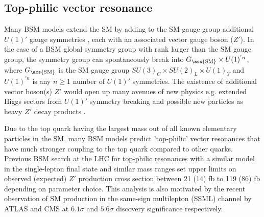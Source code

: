 \documentclass[../thesis.tex]{subfiles}
\begin{document}
\subsection{Top-philic vector resonance}
\label{sec:ttZp}
Many \acs{BSM} models extend the \acs{SM} by adding to the \acs{SM} gauge group additional $U(1)'$ gauge symmetries \citep{theory:Zp_U1p,theory:Zp_U1p_ee}, each with an associated vector gauge boson ($Z'$). In the case of a \acs{BSM} global symmetry group with rank larger than the \acs{SM} gauge group, the symmetry group can spontaneously break into $G_\text{\acs{SM}}\times U(1)^{'n}$, where $G_\text{\acs{SM}}$ is the \acs{SM} gauge group $SU(3)_C \times SU(2)_L \times U(1)_Y$ and $U(1)^{'n}$ is any $n\geq 1$ number of $U(1)'$ symmetries. The existence of additional vector boson(s) $Z'$ would open up many avenues of new physics e.g. extended Higgs sectors from $U(1)'$ symmetry breaking \citep{theory:little_higgs,theory:little_higgs2}
and possible new particles as heavy $Z'$ decay products \citep{theory:Zp}.

Due to the top quark having the largest mass out of all known elementary particles in the \acs{SM}, many \acs{BSM} models \citep{Darm__2021,Craig:2015jba,Craig_2017,Branco:2011iw,PhysRevD.93.075038,higgscomp,theory:ttZp_LHC,theory:Zp_topphilic} predict 'top-philic' vector resonances that have much stronger coupling to the top quark compared to other quarks.
Previous \acs{BSM} \tttt search at the \acs{LHC} for top-philic resonances \citep{theory:ttZp_1los} with a similar model in the single-lepton final state and similar mass ranges set upper limits on observed (expected) $Z'$ production cross section between 21 (14) fb to 119 (86) fb depending on parameter choice. This analysis is also motivated by the recent observation of \acs{SM} \tttt production in the same-sign multilepton (\acs{SSML}) channel by ATLAS \citep{tttt_obs} and CMS \citep{tttt_obs_cms} at $6.1\sigma$ and $5.6\sigma$ discovery significance respectively.
\end{document}
